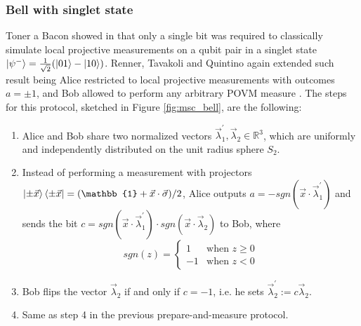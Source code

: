 \subsubsection{Bell with singlet state}\label{section:protocol_bell}
Toner a Bacon showed in \cite{toner2003} that only a single bit was required to classically simulate local projective measurements on a qubit pair in a singlet state $\ket{\psi^{-}}=\frac{1}{\sqrt{2}}(\ket{01} - \ket{10})$. Renner, Tavakoli and Quintino again extended such result being Alice restricted to local projective measurements with outcomes $a=\pm 1$, and Bob allowed to perform any arbitrary POVM measure \cite{renner2023}. The steps for this protocol, sketched in Figure \ref{fig:msc_bell}, are the following:
\begin{enumerate}
 \item Alice and Bob share two normalized vectors $\vec{\lambda}_1^{\prime}, \vec{\lambda}_2 \in \mathbb{R}^{3}$, which are uniformly and independently distributed on the unit radius sphere $S_2$.
 \item Instead of performing a measurement with projectors $\ket{\pm\vec{x}}\bra{\pm\vec{x}} = (\mathbb{1} + \vec{x} \cdot \vec{\sigma})/2$, Alice outputs $a = -sgn(\vec{x} \cdot \vec{\lambda}^{\prime}_1)$ and sends the bit $c = sgn(\vec{x} \cdot \vec{\lambda}^{\prime}_1) \cdot sgn(\vec{x} \cdot \vec{\lambda}_2)$ to Bob, where 
 \begin{equation}
sgn(z) =
    \begin{cases}
      1 & \text{when $z \ge 0$}\\
      -1 & \text{when $z<0$}
    \end{cases} 
\end{equation}
 \item Bob flips the vector $\vec{\lambda}_2$ if and only if $c=-1$, i.e. he sets $\vec{\lambda}^{\prime}_{2} := c \vec{\lambda}_{2}$.
 \item Same as step 4 in the previous prepare-and-measure protocol.
\end{enumerate}

